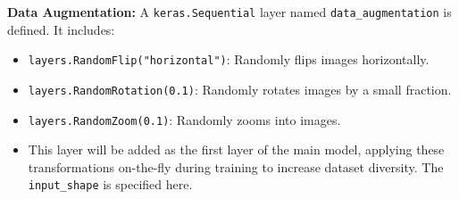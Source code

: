 \textbf{Data Augmentation:} A \verb|keras.Sequential| layer named \verb|data_augmentation| is defined. It includes:
\begin{itemize}
    \item \verb|layers.RandomFlip("horizontal")|: Randomly flips images horizontally.
    \item \verb|layers.RandomRotation(0.1)|: Randomly rotates images by a small fraction.
    \item \verb|layers.RandomZoom(0.1)|: Randomly zooms into images.
    \item This layer will be added as the first layer of the main model, applying these transformations on-the-fly during training to increase dataset diversity. The \verb|input_shape| is specified here.
\end{itemize}

